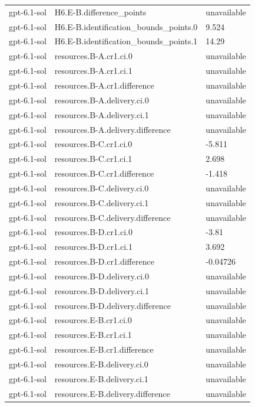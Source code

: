 \begin{tabular}{lll}
gpt-6.1-sol & H6.E-B.difference\_points & unavailable \\
gpt-6.1-sol & H6.E-B.identification\_bounds\_points.0 & 9.524 \\
gpt-6.1-sol & H6.E-B.identification\_bounds\_points.1 & 14.29 \\
gpt-6.1-sol & resources.B-A.cr1.ci.0 & unavailable \\
gpt-6.1-sol & resources.B-A.cr1.ci.1 & unavailable \\
gpt-6.1-sol & resources.B-A.cr1.difference & unavailable \\
gpt-6.1-sol & resources.B-A.delivery.ci.0 & unavailable \\
gpt-6.1-sol & resources.B-A.delivery.ci.1 & unavailable \\
gpt-6.1-sol & resources.B-A.delivery.difference & unavailable \\
gpt-6.1-sol & resources.B-C.cr1.ci.0 & -5.811 \\
gpt-6.1-sol & resources.B-C.cr1.ci.1 & 2.698 \\
gpt-6.1-sol & resources.B-C.cr1.difference & -1.418 \\
gpt-6.1-sol & resources.B-C.delivery.ci.0 & unavailable \\
gpt-6.1-sol & resources.B-C.delivery.ci.1 & unavailable \\
gpt-6.1-sol & resources.B-C.delivery.difference & unavailable \\
gpt-6.1-sol & resources.B-D.cr1.ci.0 & -3.81 \\
gpt-6.1-sol & resources.B-D.cr1.ci.1 & 3.692 \\
gpt-6.1-sol & resources.B-D.cr1.difference & -0.04726 \\
gpt-6.1-sol & resources.B-D.delivery.ci.0 & unavailable \\
gpt-6.1-sol & resources.B-D.delivery.ci.1 & unavailable \\
gpt-6.1-sol & resources.B-D.delivery.difference & unavailable \\
gpt-6.1-sol & resources.E-B.cr1.ci.0 & unavailable \\
gpt-6.1-sol & resources.E-B.cr1.ci.1 & unavailable \\
gpt-6.1-sol & resources.E-B.cr1.difference & unavailable \\
gpt-6.1-sol & resources.E-B.delivery.ci.0 & unavailable \\
gpt-6.1-sol & resources.E-B.delivery.ci.1 & unavailable \\
gpt-6.1-sol & resources.E-B.delivery.difference & unavailable \\

\end{tabular}
